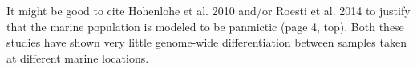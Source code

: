 \reply{
}


\begin{point}{}
It might be good to cite Hohenlohe et al. 2010 and/or Roesti et al. 2014 to justify that the marine population is modeled to be panmictic (page 4, top). Both these studies have shown very little genome-wide differentiation between samples taken at different marine locations.
\end{point}

\reply{
}


